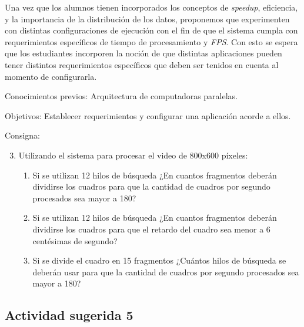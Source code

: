 Una vez que los alumnos tienen incorporados los conceptos de \emph{speedup},
eficiencia, y la importancia de la distribución de los datos, proponemos que
experimenten con distintas configuraciones de ejecución con el fin de que el
sistema cumpla con requerimientos específicos de tiempo de procesamiento y
\emph{FPS}. Con esto se espera que los estudiantes incorporen la noción de que
distintas aplicaciones pueden tener distintos requerimientos específicos que
deben ser tenidos en cuenta al momento de configurarla.

\begin{description}

	\item{Conocimientos previos}: Arquitectura de computadoras paralelas.

	\item{Objetivos}: Establecer requerimientos y configurar una aplicación
		acorde a ellos.

	\item{Consigna}: \begin{enumerate}

	\setcounter{enumi}{2}

	\item{Utilizando el sistema para procesar el video de 800x600 píxeles:

\begin{enumerate}

	\item{Si se utilizan 12 hilos de búsqueda ¿En cuantos fragmentos deberán
		dividirse los cuadros para que la cantidad de cuadros por
		segundo procesados sea mayor a 180?}

	\item{Si se utilizan 12 hilos de búsqueda ¿En cuantos fragmentos deberán
		dividirse los cuadros para que el retardo del cuadro sea menor a
		6 centésimas de segundo?}

	\item{Si se divide el cuadro en 15 fragmentos ¿Cuántos hilos de búsqueda
		se deberán usar para que la cantidad de cuadros por segundo
		procesados sea mayor a 180?}

\end{enumerate}}

\end{enumerate}

\end{description}

\subsection{Actividad sugerida 5}

